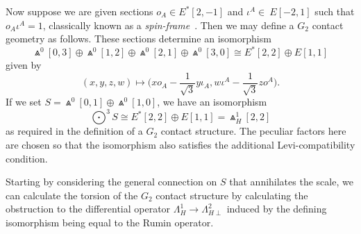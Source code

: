 \documentclass[10pt,a4paper]{amsart}
\numberwithin{equation}{section}
\begin{document}
Now suppose we are given sections
$o_A\in E^*[2,-1]$ and $\iota^A\in\ E[-2,1]$ such that
$o_A\iota^A = 1$,
classically known as a {\em spin-frame}~\cite[pp.~110--115]{OT}. Then we
may define a $G_2$ contact geometry as follows. These sections determine an
isomorphism
\[\Wedge^0[0,3] \oplus \Wedge^0[1,2] \oplus \Wedge^0[2,1] \oplus \Wedge^0[3,0]
\cong
E^*[2,2] \oplus E[1,1]\]
given by
\begin{equation}\textstyle\label{defining_isomorphism}
(x,y,z,w)\longmapsto
\big(xo_A-\frac{1}{\sqrt{3}}y\iota_A,w\iota^A-\frac{1}{\sqrt{3}}zo^A\big).
\end{equation}
If we set
$S = \Wedge^0[0,1] \oplus \Wedge^0[1,0]$,
we have an isomorphism
\[\textstyle\bigodot^3\!S\cong E^*[2,2] \oplus E[1,1] = \Wedge_H^1[2,2]\]
as required in the definition of a $G_2$ contact structure. The peculiar
factors here are chosen so that the isomorphism also satisfies the additional
Levi-compatibility condition.

Starting by considering the general connection on $S$ that
annihilates the scale, we can calculate the torsion of the $G_2$ contact
structure by calculating the obstruction to the differential operator
$\Lambda_H^1 \to \Lambda_{H\perp}^2$ induced by the defining isomorphism being
equal to the Rumin operator.
\end{document}
